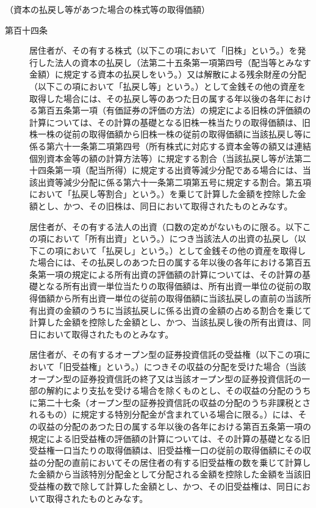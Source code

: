 \documentclass[twocolumn,a4j,10pt]{ltjtarticle}
\begin{document}
\noindent\hspace{10pt}（資本の払戻し等があつた場合の株式等の取得価額）
\begin{description}
\item[第百十四条]居住者が、その有する株式（以下この項において「旧株」という。）を発行した法人の資本の払戻し（法第二十五条第一項第四号（配当等とみなす金額）に規定する資本の払戻しをいう。）又は解散による残余財産の分配（以下この項において「払戻し等」という。）として金銭その他の資産を取得した場合には、その払戻し等のあつた日の属する年以後の各年における第百五条第一項（有価証券の評価の方法）の規定による旧株の評価額の計算については、その計算の基礎となる旧株一株当たりの取得価額は、旧株一株の従前の取得価額から旧株一株の従前の取得価額に当該払戻し等に係る第六十一条第二項第四号（所有株式に対応する資本金等の額又は連結個別資本金等の額の計算方法等）に規定する割合（当該払戻し等が法第二十四条第一項（配当所得）に規定する出資等減少分配である場合には、当該出資等減少分配に係る第六十一条第二項第五号に規定する割合。第五項において「払戻し等割合」という。）を乗じて計算した金額を控除した金額とし、かつ、その旧株は、同日において取得されたものとみなす。
\item[]居住者が、その有する法人の出資（口数の定めがないものに限る。以下この項において「所有出資」という。）につき当該法人の出資の払戻し（以下この項において「払戻し」という。）として金銭その他の資産を取得した場合には、その払戻しのあつた日の属する年以後の各年における第百五条第一項の規定による所有出資の評価額の計算については、その計算の基礎となる所有出資一単位当たりの取得価額は、所有出資一単位の従前の取得価額から所有出資一単位の従前の取得価額に当該払戻しの直前の当該所有出資の金額のうちに当該払戻しに係る出資の金額の占める割合を乗じて計算した金額を控除した金額とし、かつ、当該払戻し後の所有出資は、同日において取得されたものとみなす。
\item[]居住者が、その有するオープン型の証券投資信託の受益権（以下この項において「旧受益権」という。）につきその収益の分配を受けた場合（当該オープン型の証券投資信託の終了又は当該オープン型の証券投資信託の一部の解約により支払を受ける場合を除くものとし、その収益の分配のうちに第二十七条（オープン型の証券投資信託の収益の分配のうち非課税とされるもの）に規定する特別分配金が含まれている場合に限る。）には、その収益の分配のあつた日の属する年以後の各年における第百五条第一項の規定による旧受益権の評価額の計算については、その計算の基礎となる旧受益権一口当たりの取得価額は、旧受益権一口の従前の取得価額にその収益の分配の直前においてその居住者の有する旧受益権の数を乗じて計算した金額から当該特別分配金として分配される金額を控除した金額を当該旧受益権の数で除して計算した金額とし、かつ、その旧受益権は、同日において取得されたものとみなす。

\end{description}
\end{document}
